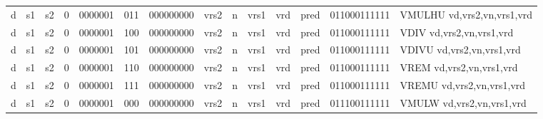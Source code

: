 \begin{landscape}
\begin{table}[p]
\begin{small}
\begin{center}
\begin{tabular}{p{0.08in}@{}p{0.08in}@{}p{0.08in}@{}p{0.08in}@{}p{0.50in}@{}p{0.30in}@{}p{0.08in}@{}p{0.8in}@{}p{0.48in}@{}p{0.32in}@{}p{0.08in}@{}p{0.8in}@{}p{0.8in}@{}p{0.4in}@{}p{0.56in}l}
\multicolumn{1}{|c|}{d} &
\multicolumn{1}{c|}{s1} &
\multicolumn{1}{c|}{s2} &
\multicolumn{1}{c|}{0} &
\multicolumn{1}{c|}{0000001} &
\multicolumn{1}{c|}{011} &
\multicolumn{2}{c|}{000000000} &
\multicolumn{2}{c|}{vrs2} &
\multicolumn{1}{c|}{n} &
\multicolumn{1}{c|}{vrs1} &
\multicolumn{1}{c|}{vrd} &
\multicolumn{1}{c|}{pred} &
\multicolumn{1}{c|}{011000111111} & VMULHU vd,vrs2,vn,vrs1,vrd \\
\cline{1-15}
  

\multicolumn{1}{|c|}{d} &
\multicolumn{1}{c|}{s1} &
\multicolumn{1}{c|}{s2} &
\multicolumn{1}{c|}{0} &
\multicolumn{1}{c|}{0000001} &
\multicolumn{1}{c|}{100} &
\multicolumn{2}{c|}{000000000} &
\multicolumn{2}{c|}{vrs2} &
\multicolumn{1}{c|}{n} &
\multicolumn{1}{c|}{vrs1} &
\multicolumn{1}{c|}{vrd} &
\multicolumn{1}{c|}{pred} &
\multicolumn{1}{c|}{011000111111} & VDIV vd,vrs2,vn,vrs1,vrd \\
\cline{1-15}
  

\multicolumn{1}{|c|}{d} &
\multicolumn{1}{c|}{s1} &
\multicolumn{1}{c|}{s2} &
\multicolumn{1}{c|}{0} &
\multicolumn{1}{c|}{0000001} &
\multicolumn{1}{c|}{101} &
\multicolumn{2}{c|}{000000000} &
\multicolumn{2}{c|}{vrs2} &
\multicolumn{1}{c|}{n} &
\multicolumn{1}{c|}{vrs1} &
\multicolumn{1}{c|}{vrd} &
\multicolumn{1}{c|}{pred} &
\multicolumn{1}{c|}{011000111111} & VDIVU vd,vrs2,vn,vrs1,vrd \\
\cline{1-15}
  

\multicolumn{1}{|c|}{d} &
\multicolumn{1}{c|}{s1} &
\multicolumn{1}{c|}{s2} &
\multicolumn{1}{c|}{0} &
\multicolumn{1}{c|}{0000001} &
\multicolumn{1}{c|}{110} &
\multicolumn{2}{c|}{000000000} &
\multicolumn{2}{c|}{vrs2} &
\multicolumn{1}{c|}{n} &
\multicolumn{1}{c|}{vrs1} &
\multicolumn{1}{c|}{vrd} &
\multicolumn{1}{c|}{pred} &
\multicolumn{1}{c|}{011000111111} & VREM vd,vrs2,vn,vrs1,vrd \\
\cline{1-15}
  

\multicolumn{1}{|c|}{d} &
\multicolumn{1}{c|}{s1} &
\multicolumn{1}{c|}{s2} &
\multicolumn{1}{c|}{0} &
\multicolumn{1}{c|}{0000001} &
\multicolumn{1}{c|}{111} &
\multicolumn{2}{c|}{000000000} &
\multicolumn{2}{c|}{vrs2} &
\multicolumn{1}{c|}{n} &
\multicolumn{1}{c|}{vrs1} &
\multicolumn{1}{c|}{vrd} &
\multicolumn{1}{c|}{pred} &
\multicolumn{1}{c|}{011000111111} & VREMU vd,vrs2,vn,vrs1,vrd \\
\cline{1-15}
  

\multicolumn{1}{|c|}{d} &
\multicolumn{1}{c|}{s1} &
\multicolumn{1}{c|}{s2} &
\multicolumn{1}{c|}{0} &
\multicolumn{1}{c|}{0000001} &
\multicolumn{1}{c|}{000} &
\multicolumn{2}{c|}{000000000} &
\multicolumn{2}{c|}{vrs2} &
\multicolumn{1}{c|}{n} &
\multicolumn{1}{c|}{vrs1} &
\multicolumn{1}{c|}{vrd} &
\multicolumn{1}{c|}{pred} &
\multicolumn{1}{c|}{011100111111} & VMULW vd,vrs2,vn,vrs1,vrd \\
\cline{1-15}
  


\end{tabular}
\end{center}
\end{small}
\end{table}
\end{landscape}
